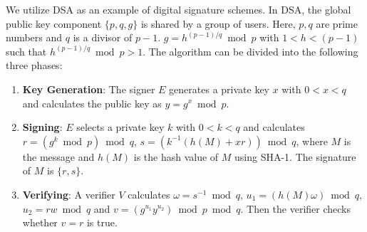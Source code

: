 \documentclass[english,draftcls,onecolumn,11pt]{IEEEtran}
\theoremstyle{definition}
\theoremstyle{plain}
\theoremstyle{plain}
\theoremstyle{definition}
\begin{document}
We utilize DSA \cite{william2003} as an example of digital signature
schemes. In DSA, the global public key component $\{p,q,g\}$ is shared
by a group of users. Here, $p,q$ are prime numbers and $q$ is a
divisor of $p-1$. $g=h^{(p-1)/q}\bmod p$ with $1<h<(p-1)$ such
that $h^{(p-1)/q}\bmod p>1$. The algorithm can be divided into the
following three phases:
\begin{enumerate}
\item \textbf{Key Generation}: The signer $E$ generates a private key $x$
with $0<x<q$ and calculates the public key as $y=g^{x}\bmod p$.
\item \textbf{Signing}: $E$ selects a private key $k$ with $0<k<q$ and
calculates $r=(g^{k}\bmod p)\bmod q$, $s=(k^{-1}(h(M)+xr))\bmod q$,
where $M$ is the message and $h(M)$ is the hash value of $M$ using
SHA-1. The signature of $M$ is $\{r,s\}$.
\item \textbf{Verifying}: A verifier $V$ calculates $\omega=s^{-1}\bmod q$,
$u_{1}=(h(M)\omega)\bmod q$, $u_{2}=rw\bmod q$ and $v=(g^{u_{1}}y^{u_{2}})\bmod p\bmod q$.
Then the verifier checks whether $v=r$ is true.
\end{enumerate}
\end{document}
